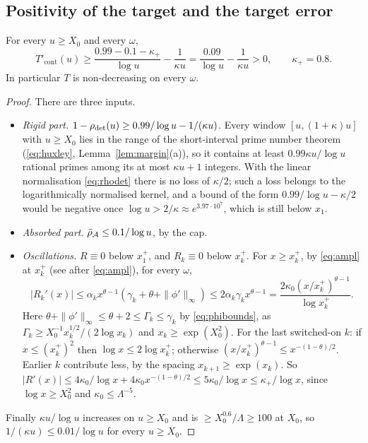 \subsection{Positivity of the target and the target error}
\begin{lemma}\label{lem:G1}
For every $u\ge X_0$ and every $\omega$,
\begin{equation}\label{eq:G1}
  T'_{\mathrm{cont}}(u)\ge\frac{0.99-0.1-\kappa_+}{\log u}-\frac{1}{\kappa u}=\frac{0.09}{\log u}-\frac1{\kappa u}>0,\qquad\kappa_+=0.8.
\end{equation}
In particular $T$ is non-decreasing on every $\omega$.
\end{lemma}
\begin{proof}
There are three inputs.
\begin{itemize}
\item \emph{Rigid part.} $1-\rho_{\mathrm{det}}(u)\ge0.99/\log u-1/(\kappa u)$. Every window $[u,(1+\kappa)u]$ with $u\ge X_0$ lies in the range of
the short-interval prime number theorem (\eqref{eq:huxley}, Lemma~\ref{lem:margin}(a)), so it contains at least $0.99\kappa u/\log u$
rational primes among its at most $\kappa u+1$ integers. With the linear normalisation \eqref{eq:rhodet} there is no loss of
$\kappa/2$; such a loss belongs to the logarithmically normalised kernel, and a bound of the form $0.99/\log u-\kappa/2$ would be
negative once $\log u>2/\kappa\approx e^{3.97\cdot10^7}$, which is still below $x_1$.
\item \emph{Absorbed part.} $\bar\rho_{\mathcal{A}}\le0.1/\log u$, by the cap.
\item \emph{Oscillations.} $R\equiv0$ below $x_1^+$, and $R_k\equiv0$ below $x_k^+$. For $x\ge x_k^+$, by \eqref{eq:ampl} at $x_k^+$
(see after \eqref{eq:ampl}), for every $\omega$,
\[
  |R_k'(x)|\le\alpha_kx^{\theta-1}(\gamma_k+\theta+\|\phi'\|_\infty)\le2\alpha_k\gamma_kx^{\theta-1}
  =\frac{2\kappa_0(x/x_k^+)^{\theta-1}}{\log x_k^+}.
\]
Here $\theta+\|\phi'\|_\infty\le\theta+2\le\Gamma_k\le\gamma_k$ by \eqref{eq:phibounds}, as $\Gamma_k\ge X_0^{-1}x_k^{1/2}/(2\log x_k)$
and $x_k\ge\exp(X_0^2)$. For the last switched-on $k$: if $x\le(x_k^+)^2$ then $\log x\le2\log x_k^+$; otherwise $(x/x_k^+)^{\theta-1}\le x^{-(1-\theta)/2}$. Earlier $k$
contribute less, by the spacing $x_{k+1}\ge\exp(x_k)$. So
$|R'(x)|\le4\kappa_0/\log x+4\kappa_0x^{-(1-\theta)/2}\le5\kappa_0/\log x\le\kappa_+/\log x$, since $\log x\ge X_0^2$ and $\kappa_0\le\Lambda^{-5}$.
\end{itemize}
Finally $\kappa u/\log u$ increases on $u\ge X_0$ and is $\ge X_0^{0.6}/\Lambda\ge100$ at $X_0$, so $1/(\kappa u)\le0.01/\log u$ for every
$u\ge X_0$.
\end{proof}

